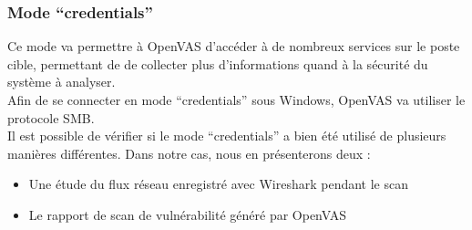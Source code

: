 \subsubsection{Mode \enquote{credentials}}
Ce mode va permettre à OpenVAS d'accéder à de nombreux services sur le poste cible, permettant de de collecter plus d'informations quand à la sécurité du système à analyser.\\
Afin de se connecter en mode \enquote{credentials} sous Windows, OpenVAS va utiliser le protocole SMB.\\
Il est possible de vérifier si le mode \enquote{credentials} a bien été utilisé de plusieurs manières différentes. Dans notre cas, nous en présenterons deux :
\begin{itemize}
 \item Une étude du flux réseau enregistré avec Wireshark pendant le scan
 \item Le rapport de scan de vulnérabilité généré par OpenVAS
\end{itemize}
